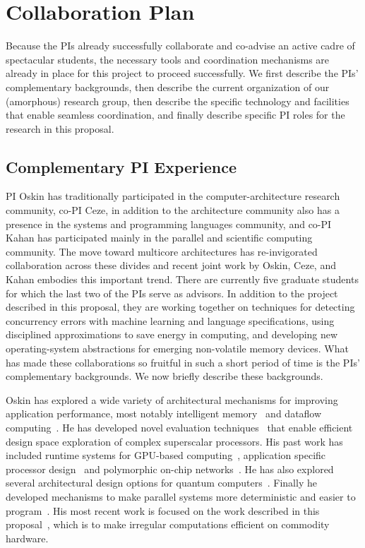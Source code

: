 \newpage
\section*{Collaboration Plan}

Because the PIs already successfully collaborate and co-advise an
active cadre of spectacular students, the necessary tools and
coordination mechanisms are already in place for this project to
proceed successfully.  We first describe the PIs' complementary
backgrounds, then describe the current organization of our (amorphous)
research group, then describe the specific technology and facilities
that enable seamless coordination, and finally describe specific PI roles
for the research in this proposal.

\subsection*{Complementary PI Experience}

PI Oskin has traditionally participated in the computer-architecture research
community, co-PI Ceze, in addition to the architecture community also has a
presence in the systems and programming languages community, and co-PI Kahan
has participated mainly in the parallel and scientific computing community.
The move toward multicore architectures has re-invigorated collaboration
across these divides and recent joint work by Oskin, Ceze, and Kahan
embodies this important trend. There are currently five graduate students for
which the last two of the PIs serve as advisors. In addition to the project
described in this proposal, they are working together on techniques for
detecting concurrency errors with machine learning and language
specifications, using disciplined approximations to save energy in computing,
and developing new operating-system abstractions for emerging non-volatile
memory devices. What has made these collaborations so fruitful in such a short
period of time is the PIs' complementary backgrounds. We now briefly describe
these backgrounds.

Oskin has explored a wide variety of architectural mechanisms for improving application performance, most notably intelligent memory~\cite{activepages} and dataflow computing~\cite{wavescalar-micro, wavescalar-isca}.  He has developed novel evaluation techniques~\cite{hls} that enable efficient design space exploration of complex superscalar processors.  His past work has included runtime systems for GPU-based computing~\cite{oskin-gpu}, application specific processor design~\cite{sherpa} and polymorphic on-chip networks~\cite{polynetworks}.  He has also explored several architectural design options for quantum computers~\cite{quantum-isca03, quantum-isca05, quantum-isca08}.  Finally he developed mechanisms to make parallel systems more deterministic and easier to program~\cite{dmp}.  His most recent work is focused on the work described in this proposal~\cite{Nelson:hotpar2011}, which is to make irregular computations efficient on commodity hardware.

